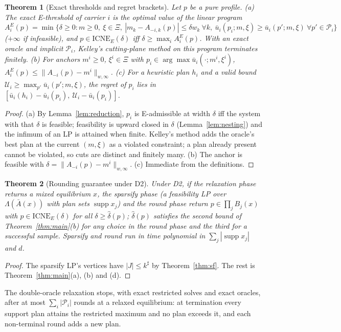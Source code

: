 \documentclass[preprint,12pt]{elsarticle}
\newtheorem{theorem}{Theorem}
\theoremstyle{definition}
\theoremstyle{remark}
\newcommand{\cP}{\mathcal{P}}
\newcommand{\ub}{\bar u}
\newcommand{\Abar}{\bar A}
\newcommand{\supp}{\operatorname{supp}}
\newcommand{\ICNE}{\mathrm{ICNE}}
\begin{document}
\begin{theorem}[Exact thresholds and regret brackets]\label{thm:cert}
Let $p$ be a pure profile. (a) The exact E-threshold of carrier $i$ is the optimal value of the linear program
$A_i^E(p)=\min\{\delta\ge0: m\ge0,\ \xi\in\Xi,\ |m_k-A_{-i,k}(p)|\le\delta w_k\ \forall k,\ \ub_i(p_i;m,\xi)\ge\ub_i(p';m,\xi)\ \forall p'\in\cP_i\}$ ($+\infty$ if infeasible), and $p\in\ICNE_E(\delta)$ iff $\delta\ge\max_iA^E_i(p)$. With an exact oracle and implicit $\cP_i$, Kelley's cutting-plane method on this program terminates finitely. (b) For anchors $m^i\ge0$, $\xi^i\in\Xi$ with $p_i\in\arg\max\ub_i(\cdot;m^i,\xi^i)$, $A_i^E(p)\le\|A_{-i}(p)-m^i\|_{w,\infty}$. (c) For a heuristic plan $h_i$ and a valid bound $\mathcal U_i\ge\max_{p'}\ub_i(p';m,\xi)$, the regret of $p_i$ lies in $[\ub_i(h_i)-\ub_i(p_i),\ \mathcal U_i-\ub_i(p_i)]$.
\end{theorem}
\begin{proof}
(a) By Lemma~\ref{lem:reduction}, $p_i$ is E-admissible at width $\delta$ iff the system with that $\delta$ is feasible; feasibility is upward closed in $\delta$ (Lemma~\ref{lem:nesting}) and the infimum of an LP is attained when finite. Kelley's method adds the oracle's best plan at the current $(m,\xi)$ as a violated constraint; a plan already present cannot be violated, so cuts are distinct and finitely many. (b) The anchor is feasible with $\delta=\|A_{-i}(p)-m^i\|_{w,\infty}$. (c) Immediate from the definitions.
\end{proof}

\begin{theorem}[Rounding guarantee under D2]\label{thm:D2}
Under D2, if the relaxation phase returns a mixed equilibrium $x$, the sparsify phase (a feasibility LP over $\Lambda(\Abar(x))$ with plan sets $\supp x_j$) and the round phase return $p\in\prod_jB_j(x)$ with $p\in\ICNE_E(\delta)$ for all $\delta\ge\hat\delta(p)$; $\hat\delta(p)$ satisfies the second bound of Theorem~\ref{thm:main}(b) for any choice in the round phase and the third for a successful sample. Sparsify and round run in time polynomial in $\sum_j|\supp x_j|$ and $d$.
\end{theorem}
\begin{proof}
The sparsify LP's vertices have $|J|\le k^\sharp$ by Theorem~\ref{thm:sf}. The rest is Theorem~\ref{thm:main}(a), (b) and (d).
\end{proof}

The double-oracle relaxation \citep{McMahan2003} stops, with exact restricted solves and exact oracles, after at most $\sum_i|\cP_i|$ rounds at a relaxed equilibrium: at termination every support plan attains the restricted maximum and no plan exceeds it, and each non-terminal round adds a new plan.
\end{document}
